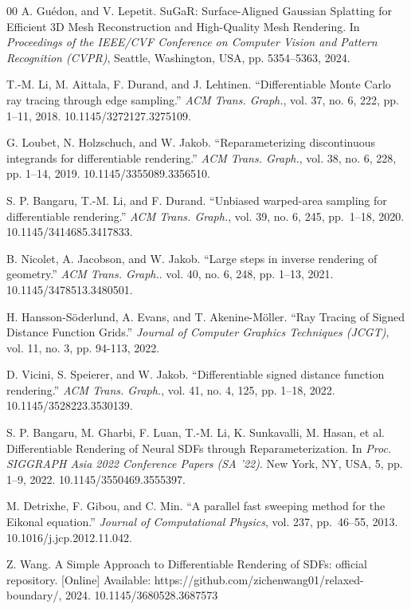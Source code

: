\documentclass{ieeeaccess}
\begin{document}
\begin{thebibliography}{00}
A. Gu\'edon, and V. Lepetit. SuGaR: Surface-Aligned Gaussian Splatting for Efficient 3D Mesh Reconstruction and High-Quality Mesh Rendering. In \textit{Proceedings of the IEEE/CVF Conference on Computer Vision and Pattern Recognition (CVPR)}, Seattle, Washington, USA, pp. 5354--5363, 2024.

T.-M. Li, M. Aittala, F. Durand, and J. Lehtinen. ``Differentiable Monte Carlo ray tracing through edge sampling.'' \textit{ACM Trans. Graph.}, vol. 37, no. 6, 222, pp. 1--11, 2018. 10.1145/3272127.3275109.

G. Loubet, N. Holzschuch, and W. Jakob. ``Reparameterizing discontinuous integrands for differentiable rendering.'' \textit{ACM Trans. Graph.}, vol. 38, no. 6, 228, pp. 1--14, 2019. 10.1145/3355089.3356510.

S. P. Bangaru, T.-M. Li, and F. Durand. ``Unbiased warped-area sampling for differentiable rendering.'' \textit{ACM Trans. Graph.}, vol. 39, no. 6, 245, \mbox{pp. 1--18,} 2020. 10.1145/3414685.3417833.


B. Nicolet, A. Jacobson, and W. Jakob. ``Large steps in inverse rendering of geometry.'' \textit{ACM Trans. Graph.}. vol. 40, no. 6, 248, pp. 1--13, 2021. 10.1145/3478513.3480501.

H. Hansson-Söderlund, A. Evans, and T. Akenine-Möller. ``Ray Tracing of Signed Distance Function Grids.'' \textit{Journal of Computer Graphics Techniques (JCGT)}, vol. 11, no. 3, pp. 94-113, 2022.

D. Vicini, S. Speierer, and W. Jakob. ``Differentiable signed distance function rendering.'' \textit{ACM Trans. Graph.}, vol. 41, no. 4, 125, pp. 1--18, 2022. 10.1145/3528223.3530139.

S. P. Bangaru, M. Gharbi, F. Luan, T.-M. Li, K. Sunkavalli, M. Hasan, et al. Differentiable Rendering of Neural SDFs through Reparameterization. In \textit{Proc. SIGGRAPH Asia 2022 Conference Papers (SA '22)}. New York, NY, USA, 5, pp. 1--9, 2022. 10.1145/3550469.3555397.

M. Detrixhe, F. Gibou, and C. Min. ``A parallel fast sweeping method for the Eikonal equation.'' \textit{Journal of Computational Physics}, vol. 237, \mbox{pp. 46--55}, 2013. 10.1016/j.jcp.2012.11.042.

Z. Wang. A Simple Approach to Differentiable Rendering of SDFs: official repository. [Online] Available: https://github.com/zichenwang01/relaxed-boundary/, 2024. 10.1145/3680528.3687573

\end{thebibliography}
\end{document}
